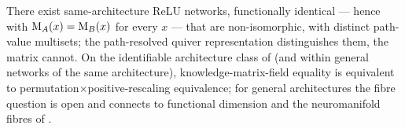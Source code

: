 \begin{proposition}
\label{prop:contraction}
There exist same-architecture ReLU networks, functionally identical --- hence
with $\mathrm{M}_A(x)=\mathrm{M}_B(x)$ for every $x$ --- that are non-isomorphic, with
distinct path-value multisets; the path-resolved quiver representation
distinguishes them, the matrix cannot. On the identifiable architecture class
of \citet{phuong2020functional} (and within general networks of the same
architecture), knowledge-matrix-field equality is equivalent to
permutation$\times$positive-rescaling equivalence; for general architectures
the fibre question is open and connects to functional dimension
\citep{grigsby2022functional} and the neuromanifold fibres of
\citet{flinth2026fibers}.
\end{proposition}

